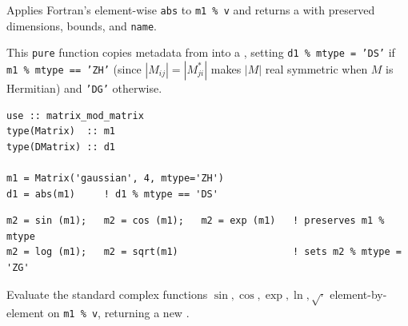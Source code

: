 Applies Fortran's element-wise \texttt{abs} to \texttt{m1 \% v} and returns a  with preserved dimensions, bounds, and \texttt{name}.

This \texttt{pure} function copies metadata from  into a  , setting \texttt{d1 \% mtype = 'DS'} if \texttt{m1 \% mtype == 'ZH'} (since $|M_{ij}| = |M_{ji}^*|$ makes $|M|$ real symmetric when $M$ is Hermitian) and \texttt{'DG'} otherwise.

\begin{description}[leftmargin=2.2cm, style=nextline]
\end{description}

\lstset{language=[95]Fortran}
\begin{lstlisting}
use :: matrix_mod_matrix
type(Matrix)  :: m1
type(DMatrix) :: d1

m1 = Matrix('gaussian', 4, mtype='ZH')
d1 = abs(m1)     ! d1 % mtype == 'DS'
\end{lstlisting}


\lstset{language=[95]Fortran}
\begin{lstlisting}
m2 = sin (m1);   m2 = cos (m1);   m2 = exp (m1)   ! preserves m1 % mtype
m2 = log (m1);   m2 = sqrt(m1)                    ! sets m2 % mtype = 'ZG'
\end{lstlisting}

Evaluate the standard complex functions $\sin, \cos, \exp, \ln, \sqrt{\cdot}$ element-by-element on \texttt{m1 \% v}, returning a new .

